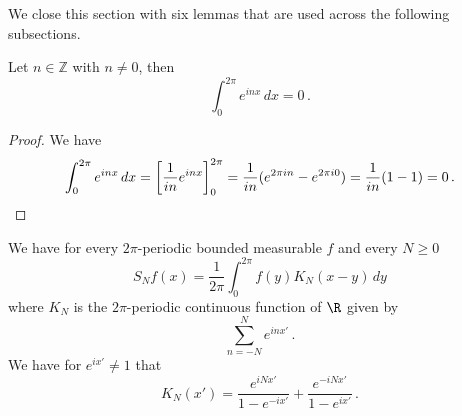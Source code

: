 We close this section with six lemmas that are used
across the following subsections.

\begin{lemma}
\label{mean-zero-oscillation}
Let $n\in \mathbb{Z}$ with $n\neq 0$, then
\begin{equation}
\int_0^{2\pi} e^{inx}\, dx=0\,.
\end{equation}
\end{lemma}
\begin{proof}
We have
\begin{equation*}
\int_0^{2\pi} e^{inx}\, dx=\left[ \frac 1{in}e^{inx}\right]_0^{2\pi}=\frac 1{in}(e^{2\pi i n}-e^{2\pi i 0})=\frac 1{in}(1-1)=0\, . \qedhere
\end{equation*}

\end{proof}

\begin{lemma}
\label{dirichlet-kernel}
\leanok
{}
We have for every $2\pi$-periodic bounded measurable $f$ and every $N\ge 0$
\begin{equation}
    S_Nf(x)=\frac 1{2\pi}\int_{0}^{2\pi}f(y) K_N(x-y)\, dy
\end{equation}
where $K_N$ is the $2\pi$-periodic continuous function of
$\R$ given by
\begin{equation}\label{eqksumexp}
\sum_{n=-N}^N e^{in x'}\, .
\end{equation}
We have for $e^{ix'}\neq 1$ that
\begin{equation}\label{eqksumhil}
    K_N(x')=\frac{e^{iNx'}}{1-e^{-ix'}}
      +\frac {e^{-iNx'}}{1-e^{ix'}} \, .
\end{equation}


\end{lemma}


